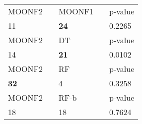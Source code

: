 \begin{tabular}{ l l l l l}
\midrule
{MOONF2} & & {MOONF1} & & {p-value}\\
11 & & \textbf{24} & & 0.2265\\
\midrule
{MOONF2} & & {DT} & & {p-value}\\
14 & & \textbf{21} & & 0.0102\\
\midrule
{MOONF2} & & {RF} & & {p-value}\\
\textbf{32} & & 4 & & 0.3258\\
\midrule
{MOONF2} & & {RF-b} & & {p-value}\\
18 & & 18 & & 0.7624\\
\midrule
\end{tabular}
